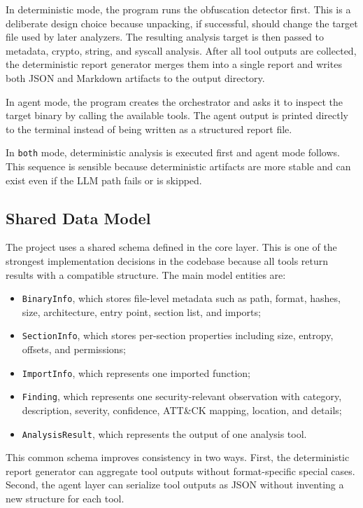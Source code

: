 \documentclass[11pt,a4paper]{article}
\begin{document}
In deterministic mode, the program runs the obfuscation detector first. This is a deliberate design choice because unpacking, if successful, should change the target file used by later analyzers. The resulting analysis target is then passed to metadata, crypto, string, and syscall analysis. After all tool outputs are collected, the deterministic report generator merges them into a single report and writes both JSON and Markdown artifacts to the output directory.

In agent mode, the program creates the orchestrator and asks it to inspect the target binary by calling the available tools. The agent output is printed directly to the terminal instead of being written as a structured report file.

In \texttt{both} mode, deterministic analysis is executed first and agent mode follows. This sequence is sensible because deterministic artifacts are more stable and can exist even if the LLM path fails or is skipped.

\subsection{Shared Data Model}
The project uses a shared schema defined in the core layer. This is one of the strongest implementation decisions in the codebase because all tools return results with a compatible structure. The main model entities are:

\begin{itemize}
\item \texttt{BinaryInfo}, which stores file-level metadata such as path, format, hashes, size, architecture, entry point, section list, and imports;
\item \texttt{SectionInfo}, which stores per-section properties including size, entropy, offsets, and permissions;
\item \texttt{ImportInfo}, which represents one imported function;
\item \texttt{Finding}, which represents one security-relevant observation with category, description, severity, confidence, ATT\&CK mapping, location, and details;
\item \texttt{AnalysisResult}, which represents the output of one analysis tool.
\end{itemize}

This common schema improves consistency in two ways. First, the deterministic report generator can aggregate tool outputs without format-specific special cases. Second, the agent layer can serialize tool outputs as JSON without inventing a new structure for each tool.
\end{document}

